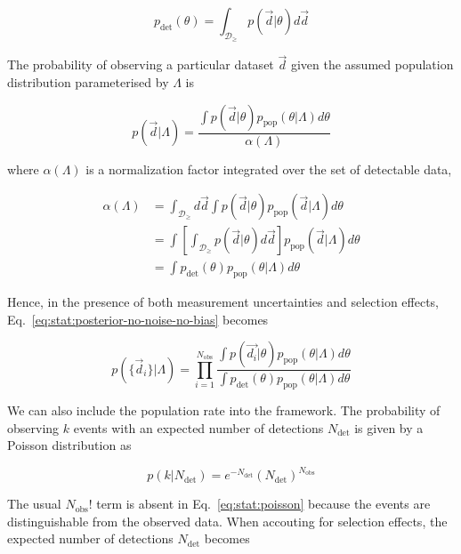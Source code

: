 \documentclass[%
preprint,
nofootinbib,
 amsmath,amssymb,
 aps,
]{revtex4-2}
\newcommand{\given}[2]{p( #1 | #2 )}
\newcommand{\ppop}[0]{p_{\text{pop}}}
\newcommand{\pdet}[0]{p_{\text{det}}}
\newcommand{\ndet}[0]{N_{\text{det}}}
\newcommand{\nobs}[0]{N_{\text{obs}}}
\begin{document}
\begin{equation}
	\label{eq:stat:detection-prob}
	\pdet(\theta) = \int_{\mathcal{D}_\geq} \given{\vec{d}}{\theta}d\vec{d}
\end{equation}

The probability of observing a particular dataset $\vec{d}$ given the assumed population
distribution parameterised by $\Lambda$ is

\begin{equation}
	\given{\vec{d}}{\Lambda} =
	\frac{\int \given{\vec{d}}{\theta} \ppop(\theta | \Lambda ) d\theta}{\alpha(\Lambda)}
\end{equation}

where $\alpha(\Lambda)$ is a normalization factor integrated over the set of detectable data,

\begin{align}
	\alpha(\Lambda) & =
	\int_{\mathcal{D}_\geq} d\vec{d} \int \given{\vec{d}}{\theta} \ppop(\vec{d} | \Lambda ) d\theta                                     \\
	                & = \int \left[ \int_{\mathcal{D}_\geq} \given{\vec{d}}{\theta} d\vec{d} \right]  \ppop(\vec{d} | \Lambda ) d\theta \\
	\label{eq:stat:nalpha}
	                & = \int \pdet(\theta) \ppop(\theta | \Lambda ) d\theta
\end{align}

Hence, in the presence of both measurement uncertainties and selection effects,
Eq.~\eqref{eq:stat:posterior-no-noise-no-bias} becomes

\begin{equation}
	\given{\{ \vec{d}_i \}}{\Lambda} =
	\prod_{i=1}^{\nobs}
	\frac{\int \given{\vec{d_i}}{\theta} \ppop(\theta | \Lambda ) d\theta}{\int \pdet(\theta) \ppop(\theta | \Lambda ) d\theta}
\end{equation}

We can also include the population rate into the framework. The probability of observing $k$ events
with an expected number of detections $\ndet$ is given by a Poisson distribution as

\begin{equation}
	\label{eq:stat:poisson}
	\given{k}{\ndet} = e^{-\ndet}(\ndet)^{\nobs}
\end{equation}

The usual $\nobs !$ term is absent in Eq.~\eqref{eq:stat:poisson} because the events are
distinguishable from the observed data. When accouting for selection effects, the expected number
of detections $\ndet$ becomes
\end{document}
